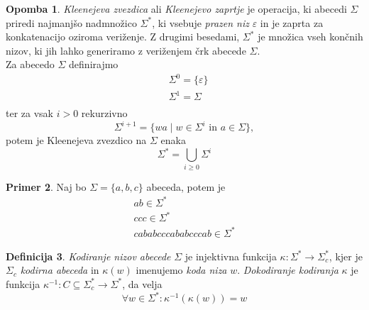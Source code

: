 \documentclass{amsart}
\theoremstyle{definition} %
\newtheorem{definicija}{Definicija}[section]
\newtheorem{primer}[definicija]{Primer}
\newtheorem{opomba}[definicija]{Opomba}
\theoremstyle{plain} %
\begin{document}
\begin{opomba}
    
    \textit{Kleenejeva zvezdica} ali \textit{Kleenejevo zaprtje} je operacija, ki
    abecedi $ \Sigma $ priredi najmanjšo nadmnožico $ \Sigma^* $, ki vsebuje
    \textit{prazen niz} $ \varepsilon $ in je zaprta za konkatenacijo oziroma veriženje.
    Z drugimi besedami, $ \Sigma^* $ je množica vseh končnih nizov, ki
    jih lahko generiramo z veriženjem črk abecede $ \Sigma $. \\
    Za abecedo $ \Sigma $ definirajmo
    \begin{align*}
        & \Sigma^0 = \{ \varepsilon \} \\
        & \Sigma^1 = \Sigma \\
    \end{align*}
    ter za vsak $ i > 0 $ rekurzivno
    \[
        \Sigma^{i+1} = \{ wa \mid w \in \Sigma^i \text{ in } a \in \Sigma \},
    \]
    potem je Kleenejeva zvezdico na $ \Sigma $ enaka
    \[
        \Sigma^* = \bigcup_{i \geq 0} \Sigma^i
    \]

\end{opomba}

\begin{primer}
    
    Naj bo $ \Sigma = \{ a,b,c \} $ abeceda, potem je
    \begin{gather*} 
        ab \in \Sigma^* \\
        ccc \in \Sigma^* \\
        cababcccababcccab \in \Sigma^*
    \end{gather*}

\end{primer}

\begin{definicija}
    
    \textit{Kodiranje nizov abecede} $ \Sigma $ je injektivna funkcija $ \kappa \colon \Sigma^* 
    \to \Sigma_c^* $, kjer je $ \Sigma_c $ \textit{kodirna abeceda} in $ \kappa(w) $ imenujemo
    \textit{koda niza} $ w $. \textit{Dokodiranje kodiranja} $ \kappa $ je funkcija 
    $ \kappa^{-1} \colon C \subseteq \Sigma^*_c \to \Sigma^* $, da velja
    \[
        \forall w \in \Sigma^* \colon \kappa^{-1}(\kappa(w)) = w
    \]

\end{definicija}
\end{document}
